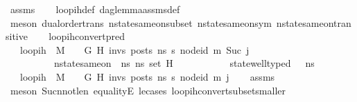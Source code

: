 \begin{isabellebody}
\ assms\isanewline
\ \ \isamarkupfalse%
\ loop{\isacharunderscore}{\kern0pt}ih{\isacharunderscore}{\kern0pt}def\ dag{\isacharunderscore}{\kern0pt}lemma{\isacharunderscore}{\kern0pt}assms{\isacharunderscore}{\kern0pt}def\isanewline
\ \ \isamarkupfalse%
\ {\isacharparenleft}{\kern0pt}meson\ dual{\isacharunderscore}{\kern0pt}order{\isachardot}{\kern0pt}trans\ nstate{\isacharunderscore}{\kern0pt}same{\isacharunderscore}{\kern0pt}on{\isacharunderscore}{\kern0pt}subset{\isacharunderscore}{\kern0pt}{}\ nstate{\isacharunderscore}{\kern0pt}same{\isacharunderscore}{\kern0pt}on{\isacharunderscore}{\kern0pt}sym\ nstate{\isacharunderscore}{\kern0pt}same{\isacharunderscore}{\kern0pt}on{\isacharunderscore}{\kern0pt}transitive{\isacharparenright}{\kern0pt}%
\endisatagproof
{\isafoldproof}%
%
\isadelimproof
\isanewline
%
\endisadelimproof
\ \ \isanewline
\isanewline
{}\isamarkupfalse%
\ loop{\isacharunderscore}{\kern0pt}ih{\isacharunderscore}{\kern0pt}convert{\isacharunderscore}{\kern0pt}pred{\isacharcolon}{\kern0pt}\isanewline
\ \ \ {\isachardoublequoteopen}loop{\isacharunderscore}{\kern0pt}ih\ \ M\ {\isasymLambda}\ {\isasymGamma}\ {\isasymOmega}\ G\ H\ invs\ posts\ ns{}\ s{\isacharprime}{\kern0pt}\ node{\isacharunderscore}{\kern0pt}id\ m{\isacharprime}{\kern0pt}\ {\isacharparenleft}{\kern0pt}Suc\ j{\isacharparenright}{\kern0pt}{\isachardoublequoteclose}\ \ \isanewline
\ \ \ \ \ \ \ \ \ \ {\isachardoublequoteopen}nstate{\isacharunderscore}{\kern0pt}same{\isacharunderscore}{\kern0pt}on\ {\isasymLambda}\ ns{}\ ns{}{\isacharprime}{\kern0pt}{\isacharprime}{\kern0pt}\ {\isacharparenleft}{\kern0pt}set\ H{\isacharparenright}{\kern0pt}{\isachardoublequoteclose}\ \isanewline
\ \ \ \ \ \ \ \ \ \ {\isachardoublequoteopen}state{\isacharunderscore}{\kern0pt}well{\isacharunderscore}{\kern0pt}typed\ {\isasymLambda}\ {\isasymOmega}\ ns{}{\isachardoublequoteclose}\isanewline
\ \ \ {\isachardoublequoteopen}loop{\isacharunderscore}{\kern0pt}ih\ \ M\ {\isasymLambda}\ {\isasymGamma}\ {\isasymOmega}\ G\ H\ invs\ posts\ ns{}{\isacharprime}{\kern0pt}{\isacharprime}{\kern0pt}\ s{\isacharprime}{\kern0pt}\ node{\isacharunderscore}{\kern0pt}id\ m{\isacharprime}{\kern0pt}\ j{\isachardoublequoteclose}\isanewline
%
\isadelimproof
\ \ %
\endisadelimproof
%
\isatagproof
{}\isamarkupfalse%
\ assms\isanewline
\ \ \isamarkupfalse%
\ {\isacharparenleft}{\kern0pt}meson\ Suc{\isacharunderscore}{\kern0pt}n{\isacharunderscore}{\kern0pt}not{\isacharunderscore}{\kern0pt}le{\isacharunderscore}{\kern0pt}n\ equalityE\ le{\isacharunderscore}{\kern0pt}cases\ loop{\isacharunderscore}{\kern0pt}ih{\isacharunderscore}{\kern0pt}convert{\isacharunderscore}{\kern0pt}subset{\isacharunderscore}{\kern0pt}smaller{\isacharparenright}{\kern0pt}%

\end{isabellebody}
